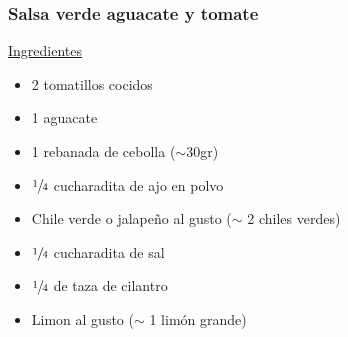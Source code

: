 \subsubsection{Salsa verde aguacate y tomate}

\underline{Ingredientes}

\begin{itemize}
\item 2 tomatillos cocidos
\item 1 aguacate
\item 1 rebanada de cebolla ($\sim$30gr)
\item $\sfrac{1}{4}$ cucharadita de ajo en polvo
\item Chile verde o jalapeño al gusto ($\sim$ 2 chiles verdes)
\item $\sfrac{1}{4}$ cucharadita de sal
\item $\sfrac{1}{4}$ de taza de cilantro
\item Limon al gusto ($\sim$ 1 lim\'on grande)
\end{itemize}
